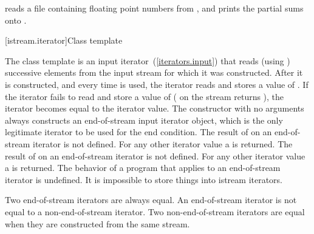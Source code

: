 reads a file containing floating point numbers from
,
and prints the partial sums onto
.
\exitexample

[istream.iterator]{Class template }

\pnum
{}%
The class template
is an input iterator~(\ref{iterators.input}) that
reads (using
)
successive elements from the input stream for which it was constructed.
After it is constructed, and every time
\tcode{++}
is used, the iterator reads and stores a value of
.
If the iterator fails to read and store a value of 
(
on the stream returns
),
the iterator becomes equal to the
iterator value.
The constructor with no arguments
always constructs
an end-of-stream input iterator object, which is the only legitimate iterator to be used
for the end condition.
The result of
on an end-of-stream iterator is not defined.
For any other iterator value a
is returned.
The result of
on an end-of-stream iterator is not defined.
For any other iterator value a
is returned.
The behavior of a program that applies  to an end-of-stream
iterator is undefined.
It is impossible to store things into istream iterators.

\pnum
Two end-of-stream iterators are always equal.
An end-of-stream iterator is not
equal to a non-end-of-stream iterator.
Two non-end-of-stream iterators are equal when they are constructed from the same stream.

